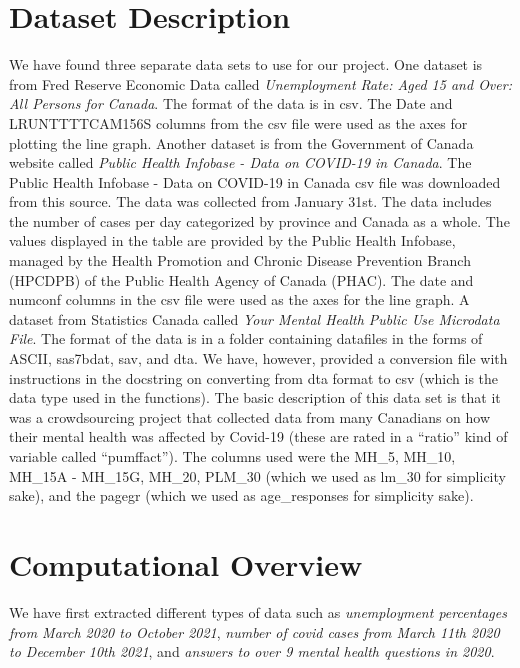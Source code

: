 \documentclass[fontsize=11pt]{article}
\begin{document}
    \section*{Dataset Description}

    We have found three separate data sets to use for our project. One dataset is from Fred Reserve Economic Data called \textit{Unemployment Rate: Aged 15 and Over: All Persons for Canada}. The format of the data is in csv. The Date and LRUNTTTTCAM156S columns from the csv file were used as the axes for plotting the line graph. Another dataset is from the Government of Canada website called \textit{Public Health Infobase - Data on COVID-19 in Canada}. The Public Health Infobase - Data on COVID-19 in Canada csv file was downloaded from this source. The data was collected from January 31st. The data includes the number of cases per day categorized by province and Canada as a whole. The values displayed in the table are provided by the Public Health Infobase, managed by the Health Promotion and Chronic Disease Prevention Branch (HPCDPB) of the Public Health Agency of Canada (PHAC). The date and numconf columns in the csv file were used as the axes for the line graph. A dataset from Statistics Canada called \textit{Your Mental Health Public Use Microdata File}. The format of the data is in a folder containing datafiles in the forms of ASCII, sas7bdat, sav, and dta. We have, however, provided a conversion file with instructions in the docstring on converting from dta format to csv (which is the data type used in the functions). The basic description of this data set is that it was a crowdsourcing project that collected data from many Canadians on how their mental health was affected by Covid-19 (these are rated in a “ratio” kind of variable called “pumffact”). The columns used were the MH\_5, MH\_10, MH\_15A - MH\_15G, MH\_20, PLM\_30 (which we used as lm\_30 for simplicity sake), and the pagegr (which we used as age\_responses for simplicity sake).

    \section*{Computational Overview}
    We have first extracted different types of data such as \emph{unemployment percentages from March 2020 to October 2021}, \emph{number of covid cases from March 11th 2020 to December 10th 2021}, and \emph{answers to over 9 mental health questions in 2020}.\\
    
\end{document}

